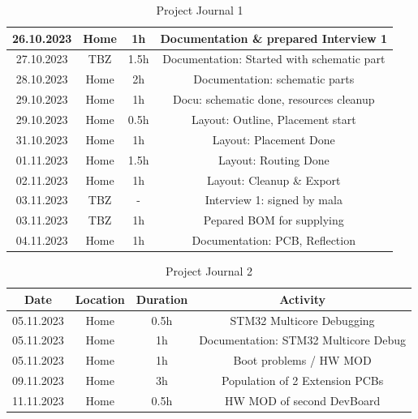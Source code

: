 \begin{table}[H]
\begin{tabular}{||c | c | c || c||}
 \hline
   26.10.2023 & Home & 1h & Documentation \& prepared Interview 1 \\ 
 \hline
  27.10.2023 & TBZ & 1.5h & Documentation: Started with schematic part \\ 
 \hline
  28.10.2023 & Home & 2h & Documentation: schematic parts \\ 
 \hline
  29.10.2023 & Home & 1h & Docu: schematic done, resources cleanup \\ 
 \hline
   29.10.2023 & Home & 0.5h & Layout: Outline, Placement start \\ 
 \hline
   31.10.2023 & Home & 1h & Layout: Placement Done \\ 
 \hline   
   01.11.2023 & Home & 1.5h & Layout: Routing Done \\ 
 \hline
  02.11.2023 & Home & 1h & Layout: Cleanup \& Export \\ 
 \hline
  03.11.2023 & TBZ & - & Interview 1: signed by mala \\ 
 \hline  
  03.11.2023 & TBZ & 1h & Pepared BOM for supplying \\ 
 \hline
  04.11.2023 & Home & 1h & Documentation: PCB, Reflection \\ 
 \hline

\end{tabular}
    \caption{Project Journal 1}\label{tab:Project Journal 1}
\end{table}

\newpage

\begin{table}[H]
  \centering
  
  \begin{tabular}{||c | c | c || c||} 
    \hline
    Date &  Location & Duration & Activity \\ [0.5ex] 
    \hline\hline
    05.11.2023 & Home & 0.5h & STM32 Multicore Debugging \\ 
    \hline
     05.11.2023 & Home & 1h & Documentation: STM32 Multicore Debug \\ 
    \hline
     05.11.2023 & Home & 1h & Boot problems / HW MOD \\ 
    \hline
    09.11.2023 & Home & 3h & Population of 2 Extension PCBs \\ 
    \hline
    11.11.2023 & Home & 0.5h & HW MOD of second DevBoard \\ 
    \hline
  \end{tabular}
  \caption{Project Journal 2}\label{tab:Project Journal 2}
\end{table}

